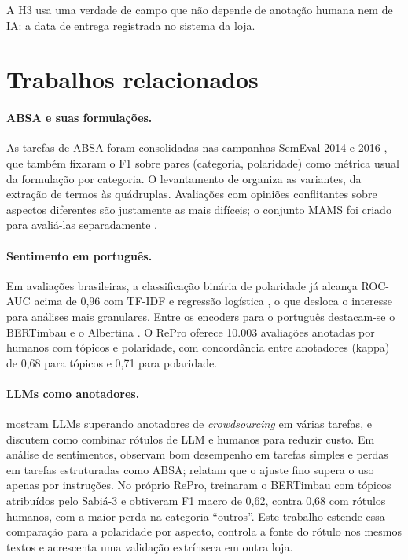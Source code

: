 \documentclass[12pt,a4paper]{article}
\begin{document}
A H3 usa uma verdade de campo que não depende de anotação humana nem de IA: a data de entrega registrada no sistema da loja.

\section{Trabalhos relacionados}

\paragraph{ABSA e suas formulações.} As tarefas de ABSA foram consolidadas nas campanhas SemEval-2014 e 2016 \citep{pontiki2014semeval,pontiki2016semeval}, que também fixaram o F1 sobre pares (categoria, polaridade) como métrica usual da formulação por categoria. O levantamento de \citet{zhang2023survey} organiza as variantes, da extração de termos às quádruplas. Avaliações com opiniões conflitantes sobre aspectos diferentes são justamente as mais difíceis; o conjunto MAMS foi criado para avaliá-las separadamente \citep{jiang2019mams}.

\paragraph{Sentimento em português.} Em avaliações brasileiras, a classificação binária de polaridade já alcança ROC-AUC acima de 0,96 com TF-IDF e regressão logística \citep{souza2021reviews}, o que desloca o interesse para análises mais granulares. Entre os encoders para o português destacam-se o BERTimbau \citep{souza2020bertimbau} e o Albertina \citep{rodrigues2023albertina}. O RePro \citep{silva2024repro} oferece 10.003 avaliações anotadas por humanos com tópicos e polaridade, com concordância entre anotadores (kappa) de 0,68 para tópicos e 0,71 para polaridade.

\paragraph{LLMs como anotadores.} \citet{gilardi2023chatgpt} mostram LLMs superando anotadores de \emph{crowdsourcing} em várias tarefas, e \citet{wang2021labeling} discutem como combinar rótulos de LLM e humanos para reduzir custo. Em análise de sentimentos, \citet{zhang2024realitycheck} observam bom desempenho em tarefas simples e perdas em tarefas estruturadas como ABSA; \citet{simmering2023llmabsa} relatam que o ajuste fino supera o uso apenas por instruções. No próprio RePro, \citet{silva2024sabia} treinaram o BERTimbau com tópicos atribuídos pelo Sabiá-3 \citep{abonizio2024sabia3} e obtiveram F1 macro de 0,62, contra 0,68 com rótulos humanos, com a maior perda na categoria ``outros''. Este trabalho estende essa comparação para a polaridade por aspecto, controla a fonte do rótulo nos mesmos textos e acrescenta uma validação extrínseca em outra loja.
\end{document}

